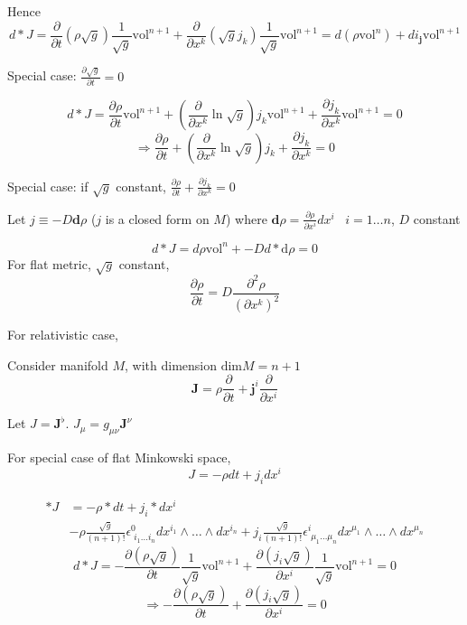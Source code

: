 \documentclass[twoside]{amsart}
\theoremstyle{plain}
\theoremstyle{definition}
\begin{document}
Hence
\begin{equation}
  d*J = \frac{ \partial }{ \partial t} (\rho \sqrt{g} ) \frac{1}{ \sqrt{g}} \text{vol}^{n+1} + \frac{ \partial }{ \partial x^k} (\sqrt{g} j_k) \frac{1}{ \sqrt{g}} \text{vol}^{n+1} = d(\rho \text{vol}^n) + di_{\mathbf{j}} \text{vol}^{n+1}
\end{equation}

Special case: $\frac{ \partial \sqrt{g}}{ \partial t} = 0$

\[
d*J = \frac{ \partial \rho}{ \partial t} \text{vol}^{n+1} + \left( \frac{ \partial }{ \partial x^k} \ln{ \sqrt{g}} \right) j_k \text{vol}^{n+1} + \frac{ \partial j_k}{ \partial x^k} \text{vol}^{n+1} = 0 
\]
\[
\Longrightarrow \frac{ \partial \rho }{ \partial t} + \left( \frac{ \partial }{ \partial x^k} \ln{ \sqrt{g}} \right) j_k + \frac{ \partial j_k }{ \partial x^k } = 0 
\]

Special case: if $\sqrt{g}$ constant, $\frac{ \partial \rho }{ \partial t } + \frac{ \partial j_k}{ \partial x^k} = 0 $

Let $j \equiv -D \mathbf{d}\rho$ ($j$ is a closed form on $M$) where $\mathbf{d}\rho = \frac{ \partial \rho }{ \partial x^i } dx^i$ \quad \, $i=1 \dots n$, $D$ constant

\[
d * J  = d\rho \text{vol}^n + - Dd * \text{d}\rho = 0 
\]
For flat metric, $\sqrt{g}$ constant,
\[
\frac{ \partial \rho }{ \partial t} = D \frac{ \partial^2 \rho }{ ( \partial x^k )^2}
\]

For relativistic case, 

Consider manifold $M$, with dimension $\text{dim}M = n+1$
\[
\mathbf{J} = \rho \frac{ \partial }{ \partial t} + \mathbf{j}^i \frac{ \partial }{ \partial x^i}
\]

Let $J = \mathbf{J}^{\flat}$.  $J_{\mu} = g_{\mu \nu} \mathbf{J}^{\nu}$

For special case of flat Minkowski space,
\[
J  = - \rho dt + j_i dx^i
\]

\[
\begin{aligned}
  *J & = - \rho * dt + j_i * dx^i \\ 
  & -\rho \frac{ \sqrt{g}}{ (n+1)!} \epsilon^0_{ \, \, i_1 \dots i_n} dx^{i_1} \wedge \dots \wedge dx^{i_n} + j_i \frac{ \sqrt{g} }{ (n+1)!} \epsilon^i_{ \, \, \mu_1 \dots \mu_n } dx^{\mu_1} \wedge \dots \wedge dx^{\mu_n}
\end{aligned}
\]
\[
d* J = -\frac{ \partial (\rho \sqrt{g}  )}{  \partial t } \frac{1}{ \sqrt{g} } \text{vol}^{n+1} + \frac{ \partial (j_i \sqrt{g} )}{  \partial x^i } \frac{1}{ \sqrt{g}} \text{vol}^{n+1} = 0 
\]
\[
\Longrightarrow - \frac{ \partial (\rho \sqrt{g})}{  \partial t} + \frac{ \partial (j_i \sqrt{g} )}{ \partial x^i } = 0 
\]
\end{document}

